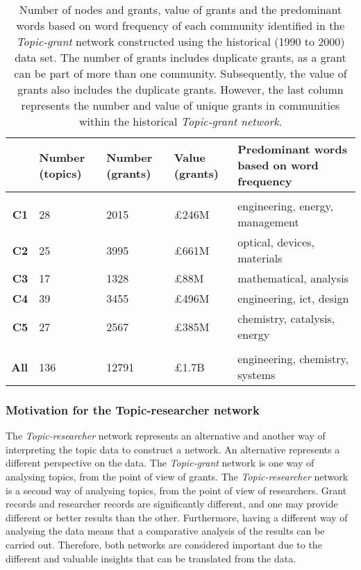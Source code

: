 \begin{table}[!htbp]
\centering
\caption[Number of nodes and grants, value of grants and the predominant words of each community identified in the \textit{Topic-grant} network constructed using the historical (1990 to 2000) data set]{Number of nodes and grants, value of grants and the predominant words based on word frequency of each community identified in the \textit{Topic-grant} network constructed using the historical (1990 to 2000) data set. The number of grants includes duplicate grants, as a grant can be part of more than one community. Subsequently, the value of grants also includes the duplicate grants. However, the last column represents the number and value of unique grants in communities within the historical \textit{Topic-grant network}.}
\label{table:topic_a_past2_numbers}
\begin{tabular}{r|>{\raggedleft\arraybackslash}p{1.6cm}>{\raggedleft\arraybackslash}p{1.6cm}>{\raggedleft\arraybackslash}p{1.6cm}>{\raggedleft\arraybackslash}p{6.3cm}}
{} & \textbf{Number (topics)} & \textbf{Number (grants)} & \textbf{Value (grants)} & \textbf{Predominant words based on word frequency}\\
\hline\\
\textbf{C1}  & {28}  & {2015}  & {\pounds246M} & {engineering, energy, management}\\
\textbf{C2}  & {25}  & {3995}  & {\pounds661M} & {optical, devices, materials}\\
\textbf{C3}  & {17}  & {1328}  & {\pounds88M}  & {mathematical, analysis}\\
\textbf{C4}  & {39}  & {3455}  & {\pounds496M} & {engineering, ict, design}\\
\textbf{C5}  & {27}  & {2567}  & {\pounds385M} & {chemistry, catalysis, energy}\\
\hline\\
\textbf{All} & {136} & {12791} & {\pounds1.7B} & {engineering, chemistry, systems}\\
\end{tabular}
\end{table}

\subsubsection{Motivation for the Topic-researcher network}

The \textit{Topic-researcher} network represents an alternative and another way of interpreting the topic data to construct a network. An alternative represents a different perspective on the data. The \textit{Topic-grant} network is one way of analysing topics, from the point of view of grants. The \textit{Topic-researcher} network is a second way of analysing topics, from the point of view of researchers. Grant records and researcher records are significantly different, and one may provide different or better results than the other. Furthermore, having a different way of analysing the data means that a comparative analysis of the results can be carried out. Therefore, both networks are considered important due to the different and valuable insights that can be translated from the data.

